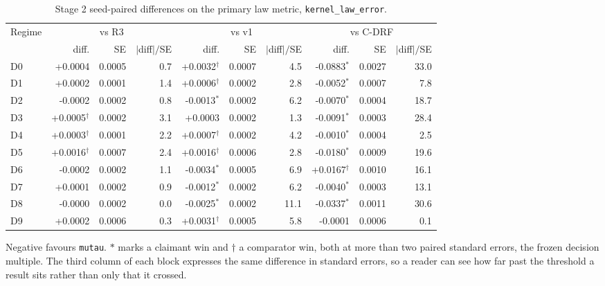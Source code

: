 \begin{table}[htbp]
\centering
\caption{Stage 2 seed-paired differences on the primary law metric, \texttt{kernel\_law\_error}.}
\label{tab:p55s2-paired-law}
\scriptsize
\setlength{\tabcolsep}{4pt}
\begin{tabular}{@{}lrrrrrrrrr@{}}
\toprule
Regime & \multicolumn{3}{c}{vs R3} & \multicolumn{3}{c}{vs v1} & \multicolumn{3}{c}{vs C-DRF} \\
  & diff. & SE & $|$diff$|/$SE & diff. & SE & $|$diff$|/$SE & diff. & SE & $|$diff$|/$SE \\
\midrule
D0 & +0.0004 & 0.0005 & 0.7 & +0.0032$^{\dagger}$ & 0.0007 & 4.5 & -0.0883$^{\ast}$ & 0.0027 & 33.0 \\
D1 & +0.0002 & 0.0001 & 1.4 & +0.0006$^{\dagger}$ & 0.0002 & 2.8 & -0.0052$^{\ast}$ & 0.0007 & 7.8 \\
D2 & -0.0002 & 0.0002 & 0.8 & -0.0013$^{\ast}$ & 0.0002 & 6.2 & -0.0070$^{\ast}$ & 0.0004 & 18.7 \\
D3 & +0.0005$^{\dagger}$ & 0.0002 & 3.1 & +0.0003 & 0.0002 & 1.3 & -0.0091$^{\ast}$ & 0.0003 & 28.4 \\
D4 & +0.0003$^{\dagger}$ & 0.0001 & 2.2 & +0.0007$^{\dagger}$ & 0.0002 & 4.2 & -0.0010$^{\ast}$ & 0.0004 & 2.5 \\
D5 & +0.0016$^{\dagger}$ & 0.0007 & 2.4 & +0.0016$^{\dagger}$ & 0.0006 & 2.8 & -0.0180$^{\ast}$ & 0.0009 & 19.6 \\
D6 & -0.0002 & 0.0002 & 1.1 & -0.0034$^{\ast}$ & 0.0005 & 6.9 & +0.0167$^{\dagger}$ & 0.0010 & 16.1 \\
D7 & +0.0001 & 0.0002 & 0.9 & -0.0012$^{\ast}$ & 0.0002 & 6.2 & -0.0040$^{\ast}$ & 0.0003 & 13.1 \\
D8 & -0.0000 & 0.0002 & 0.0 & -0.0025$^{\ast}$ & 0.0002 & 11.1 & -0.0337$^{\ast}$ & 0.0011 & 30.6 \\
D9 & +0.0002 & 0.0006 & 0.3 & +0.0031$^{\dagger}$ & 0.0005 & 5.8 & -0.0001 & 0.0006 & 0.1 \\
\bottomrule
\end{tabular}
\par\vspace{2pt}\parbox{0.96\textwidth}{\scriptsize Negative favours \texttt{mutau}. $\ast$ marks a claimant win and $\dagger$ a comparator win, both at more than two paired standard errors, the frozen decision multiple. The third column of each block expresses the same difference in standard errors, so a reader can see how far past the threshold a result sits rather than only that it crossed.}
\end{table}

